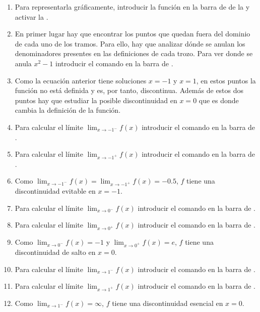 \begin{enumerate}[leftmargin=*]
      \begin{indication}
      \begin{enumerate}
      \item Para representarla gráficamente, introducir la función  en la barra de  de la  y activar la .
      \item En primer lugar hay que encontrar los puntos que quedan fuera del dominio de cada uno de los tramos.
            Para ello, hay que analizar dónde se anulan los denominadores presentes en las definiciones de cada trozo.
            Para ver donde se anula $x^2-1$ introducir el comando  en la barra de .
      \item Como la ecuación anterior tiene soluciones $x=-1$ y $x=1$, en estos puntos la función no está definida y es, por tanto, discontinua.
            Además de estos dos puntos hay que estudiar la posible discontinuidad en $x=0$ que es donde cambia la definición de la función.
      \item Para calcular el límite $\lim_{x\rightarrow -1^-}f(x)$ introducir el comando  en la barra de .
      \item Para calcular el límite $\lim_{x\rightarrow -1^+}f(x)$ introducir el comando  en la barra de .
      \item Como $\lim_{x\rightarrow -1^-}f(x)=\lim_{x\rightarrow -1^+}f(x)=-0.5$, $f$ tiene una discontinuidad evitable en $x=-1$.
      \item Para calcular el límite $\lim_{x\rightarrow 0^-}f(x)$ introducir el comando  en la barra de .
      \item Para calcular el límite $\lim_{x\rightarrow 0^+}f(x)$ introducir el comando  en la barra de .
      \item Como $\lim_{x\rightarrow 0^-}f(x)=-1$ y $\lim_{x\rightarrow 0^+}f(x)=e$, $f$ tiene una discontinuidad de salto en $x=0$.
      \item Para calcular el límite $\lim_{x\rightarrow 1^-}f(x)$ introducir el comando  en la barra de .
      \item Para calcular el límite $\lim_{x\rightarrow 1^+}f(x)$ introducir el comando  en la barra de .
      \item Como $\lim_{x\rightarrow 1^-}f(x)=\infty$, $f$ tiene una discontinuidad esencial en $x=0$.
      \end{enumerate}
      \end{indication}
\end{enumerate}


